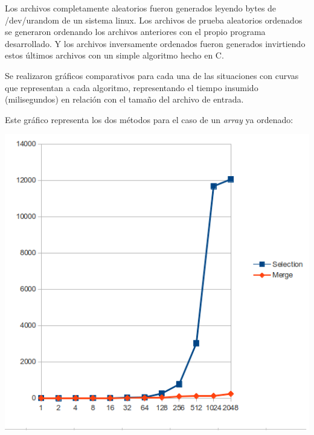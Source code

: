 \documentclass[a4paper,10pt]{article}
\begin{document}
Los archivos completamente aleatorios fueron generados leyendo bytes de /dev/urandom de un sistema linux. Los archivos de prueba aleatorios ordenados se generaron ordenando los archivos anteriores con el propio programa desarrollado. Y los archivos inversamente ordenados fueron generados invirtiendo estos \'ultimos archivos con un simple algoritmo hecho en C.

Se realizaron gr\'aficos comparativos para cada una de las situaciones con curvas que representan a cada algoritmo, representando el tiempo insumido (milisegundos) en relaci\'on con el tama\~no del archivo de entrada.

Este gr\'afico representa los dos m\'etodos para el caso de un \textit{array} ya ordenado:
\begin{center}
\includegraphics[scale=0.50]{sorted.png}
\end{center}
\end{document}
